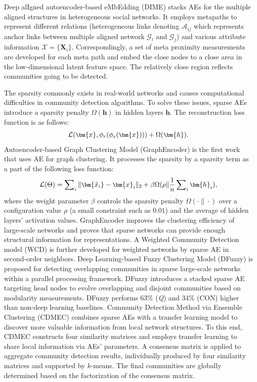 Deep alIgned autoencoder-based eMbEdding (DIME)  stacks AEs for the multiple aligned structures in heterogeneous social networks. It employs metapaths to represent different relations (heterogeneous links denoting $\mathcal{A}_{ij}$ which represents anchor links between multiple aligned network $\mathcal{G}_i$ and $\mathcal{G}_j$) and various attribute information $\mathcal{X}=\{\bm{X}_i\}$. Correspondingly, a set of meta proximity measurements are developed for each meta path and embed the close nodes to a close area in the low-dimensional latent feature space. The relatively close region reflects communities going to be detected.

\label{sec-sparse-ae}
The sparsity commonly exists in real-world networks and causes computational difficulties in community detection algorithms. To solve these issues, sparse AEs  introduce a sparsity penalty $\Omega(\bm{h})$ in hidden layers $\bm{h}$. The reconstruction loss function is as follows:
\begin{equation}
\small
\mathcal{L}(\bm{x}, \phi_r(\phi_e(\bm{x})))+\Omega(\bm{h}). 
\end{equation}
Autoencoder-based Graph Clustering Model (GraphEncoder)  is the first work that uses AE for graph clustering. It processes the sparsity by a sparsity term as a part of the following loss function: 
\begin{equation}
\small
\mathcal{L}(\Theta)=\sum\nolimits_{i}\|\bm{\hat{x}_{i}}-\bm{x}_{i}\|_{2}+\beta \Omega(\rho \| \frac{1}{n}\sum\nolimits_{i} \bm{h}_i),
\end{equation}
where the weight parameter $\beta$ controls the sparsity penalty $\Omega(\cdot\|\cdot)$ over a configuration value $\rho$ (a small constraint such as $0.01$) and the average of hidden layers' activation values. GraphEncoder improves the clustering efficiency of large-scale networks and proves that sparse networks can provide enough structural information for representations. A Weighted Community Detection model (WCD)  is further developed for weighted networks by sparse AE in second-order neighbors.
Deep Learning-based Fuzzy Clustering Model (DFuzzy)  is proposed for detecting overlapping communities in sparse large-scale networks within a parallel processing framework. DFuzzy introduces a stacked sparse AE targeting head nodes to evolve overlapping and disjoint communities based on modularity measurements. DFuzzy performs 63\% (\textit{Q}) and 34\% (CON) higher than non-deep learning baselines. 
Community Detection Method via Ensemble Clustering (CDMEC)  combines sparse AEs with a transfer learning model to discover more valuable information from local network structures. To this end, CDMEC constructs four similarity matrices and employs transfer learning to share local information via AEs' parameters. A consensus matrix is applied to aggregate community detection results, individually produced by four similarity matrices and supported by $k$-means. The final communities are globally determined based on the factorization of the consensus matrix.

